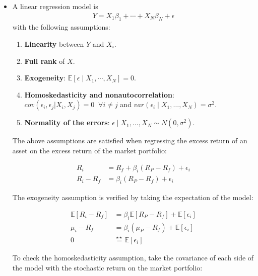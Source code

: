 \documentclass[10pt]{article}
\newcommand{\Ebb}{\mathbb{E}}
\newenvironment{exercise}[2][Exercise]{\begin{trivlist}
  \item[\hskip \labelsep {\bfseries #1}\hskip \labelsep {\bfseries #2.}]}{\end{trivlist}}
\begin{document}
\begin{exercise}{1}
\begin{itemize}
          \item
            A linear regression model is
            \begin{align*}
              Y = X_1 \beta_1 + \cdots + X_N \beta_N + \epsilon
            \end{align*}
            with the following assumptions:
            \begin{enumerate}[\textbf{A}1.]
              \item \textbf{Linearity} between $Y$ and $X_i$.
              \item \textbf{Full rank}  of $X$.
              \item \textbf{Exogeneity}: $\Ebb\left[ \epsilon \mid X_1,
                  \cdots, X_N \right] = 0$.
              \item \textbf{Homoskedasticity and nonautocorrelation}: 
                $cov(\epsilon_i, \epsilon_j | X_i, X_j) = 0 \;\; \forall i \neq j$
                and $var(\epsilon_i \mid X_1, \ldots, X_N) = \sigma^2$.
              \item \textbf{Normality of the errors}: $\epsilon \mid X_1,
                \ldots, X_N \sim N(0, \sigma^2)$.
            \end{enumerate}

              The above assumptions are satisfied when regressing the excess
             return of an asset on the excess return of the market portfolio:

             \begin{align*}
               R_i &= R_f + \beta_i(R_P - R_f) + \epsilon_i \\
               R_i - R_f &= \beta_i(R_P - R_f) + \epsilon_i
             \end{align*}

             The exogeneity assumption is verified by taking the expectation of
             the model:

             \begin{align*}
               \Ebb\left[ R_i - R_f \right] &= \beta_i \Ebb\left[ R_P - R_f \right] + \Ebb\left[ \epsilon_i \right] \\
               \mu_i - R_f &= \beta_i (\mu_P - R_f) + \Ebb\left[ \epsilon_i \right] \\
                0 &\stackrel{\star \star}{=} \Ebb\left[ \epsilon_i \right]
             \end{align*}

             To check the homoskedasticity assumption, take the covariance of each side of
             the model with the stochastic return on the market
             portfolio:


\end{itemize}
\end{exercise}
\end{document}

